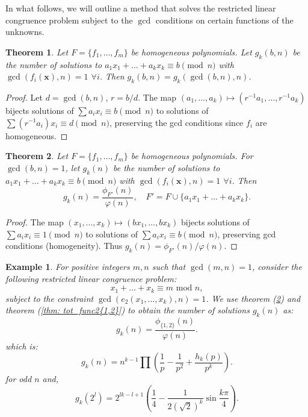 \documentclass[12pt]{article}
\newtheorem{thm}{Theorem}[subsection]%
\newtheorem{exmp}{Example}[subsection]%
\begin{document}
In what follows, we will outline a method that solves the restricted linear congruence problem subject to the $\gcd$ conditions on certain functions of the unknowns.
\begin{thm}\label{thm: even}
Let $F=\{f_1,\dots,f_m\}$ be homogeneous polynomials. Let $g_k(b,n)$ be the number of solutions to $a_1x_1+\dots+a_kx_k\equiv b\pmod{n}$ with $\gcd(f_i(\mathbf{x}),n)=1$ $\forall i$. Then $g_k(b,n)=g_k(\gcd(b,n),n)$.
\end{thm}

\begin{proof}
Let $d=\gcd(b,n)$, $r=b/d$. The map $(a_1,\dots,a_k)\mapsto(r^{-1}a_1,\dots,r^{-1}a_k)$ bijects solutions of $\sum a_ix_i\equiv b\pmod{n}$ to solutions of $\sum(r^{-1}a_i)x_i\equiv d\pmod{n}$, preserving the gcd conditions since $f_i$ are homogeneous.
\end{proof}

\begin{thm}\label{thm:rest_lin_cong}
Let $F=\{f_1,\dots,f_m\}$ be homogeneous polynomials. For $\gcd(b,n)=1$, let $g_k(n)$ be the number of solutions to $a_1x_1+\dots+a_kx_k\equiv b\pmod{n}$ with $\gcd(f_i(\mathbf{x}),n)=1$ $\forall i$. Then
$$
g_k(n)=\frac{\phi_{F'}(n)}{\varphi(n)},\quad F'=F\cup\{a_1x_1+\dots+a_kx_k\}.
$$
\end{thm}

\begin{proof}
The map $(x_1,\dots,x_k)\mapsto(bx_1,\dots,bx_k)$ bijects solutions of $\sum a_ix_i\equiv1\pmod{n}$ to solutions of $\sum a_ix_i\equiv b\pmod{n}$, preserving gcd conditions (homogeneity). Thus $g_k(n)=\phi_{F'}(n)/\varphi(n)$.
\end{proof}
\begin{exmp}
    For positive integers $m,n$ such that $\gcd(m,n)=1$, consider the following restricted linear congruence problem:
    \begin{equation}
        x_1+\dots+x_k\equiv m\text{ mod }n,
    \end{equation}
    subject to the constraint $\gcd(e_2(x_1,\dots, x_k), n)=1$.
    We use theorem (\ref{thm:rest_lin_cong}) and theorem (\ref{thm: tot_func2{1,2}}) to obtain the number of solutions $g_k(n)$ as:\[
    g_k(n)=\frac{\phi_{\{1,2\}}(n)}{\varphi(n)}.
    \]
    which is:
    \[
    g_k(n)=n^{k-1}\prod\left(\frac{1}{p}-\frac{1}{p^2}+\frac{h_k(p)}{p^k}\right).
    \]
    for odd $n$ and,
    \[
    g_k(2^l)=2^{lk-l+1}\left(\frac{1}{4}-\frac{1}{2\left(\sqrt{2}\right)^k}\sin\frac{k\pi}{4}\right).
    \]
\end{exmp}
\end{document}
